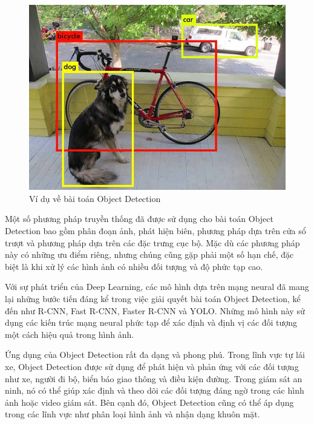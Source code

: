 \graphicspath{{figures/}}
\begin{figure}[h!]
  \centering
  \includegraphics[scale=0.4]{graphics/object detection.png}
  \caption{Ví dụ về bài toán Object Detection}
\end{figure}

Một số phương pháp truyền thống đã được sử dụng cho bài toán Object Detection bao gồm phân đoạn ảnh, phát hiện biên, phương pháp dựa trên cửa sổ trượt và phương pháp dựa trên các đặc trưng cục bộ. Mặc dù các phương pháp này có những ưu điểm riêng, nhưng chúng cũng gặp phải một số hạn chế, đặc biệt là khi xử lý các hình ảnh có nhiều đối tượng và độ phức tạp cao.

Với sự phát triển của Deep Learning, các mô hình dựa trên mạng neural đã mang lại những bước tiến đáng kể trong việc giải quyết bài toán Object Detection, kể đến như R-CNN, Fast R-CNN, Faster R-CNN và YOLO. Những mô hình này sử dụng các kiến trúc mạng neural phức tạp để xác định và định vị các đối tượng một cách hiệu quả trong hình ảnh.

Ứng dụng của Object Detection rất đa dạng và phong phú. Trong lĩnh vực tự lái xe, Object Detection được sử dụng để phát hiện và phản ứng với các đối tượng như xe, người đi bộ, biển báo giao thông và điều kiện đường. Trong giám sát an ninh, nó có thể giúp xác định và theo dõi các đối tượng đáng ngờ trong các hình ảnh hoặc video giám sát. Bên cạnh đó, Object Detection cũng có thể áp dụng trong các lĩnh vực như phân loại hình ảnh và nhận dạng khuôn mặt.

